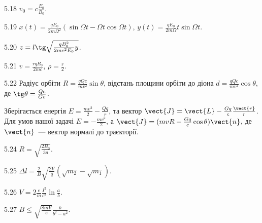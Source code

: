 \begin{Solution}{5.{18}}
	$v_0 = c\frac{E_0}{B_0}$.
\end{Solution}
\begin{Solution}{5.{19}}
	$x(t)  = \frac{qE_0}{2m\Omega^2}\left( \sin\Omega t - \Omega t\cos\Omega t \right) $,
	$y(t)  = \frac{qE_0}{2m\Omega}t\sin\Omega t$.
\end{Solution}
\begin{Solution}{5.{20}}
	$z = l\tg\sqrt{\frac{qB_0^2}{2mc^2E_0}y}$.
\end{Solution}
\begin{Solution}{5.{21}}
	$v = \frac{rqB_0}{2mc}$, $\rho = \frac{r}{2}$.
\end{Solution}
\begin{Solution}{5.{22}}
	Радіус орбіти $R = \frac{qQc}{mv^2}\sin\theta$, відстань площини орбіти до діона $d = \frac{qQc}{mv^2}\cos\theta$, де $\tg\theta = \frac{Q c}{G v}$.

	Зберігається енергія $E = \frac{mv^2}{2} - \frac{Qq}{r}$, та вектор $\vect{J} = \vect{L} - \frac{Gq}{c}\frac{\vect{r}}{r} $. Для умов нашої задачі $E = -\frac{mv^2}{2}$, а $\vect{J} = (mvR - \frac{Gq}{c}\cos\theta) \vect{n} $, де $\vect{n}$~--- вектор нормалі до траєкторії.
\end{Solution}
\begin{Solution}{5.{24}}
	$R = \sqrt{\frac{2B_0}{3a}}.$
\end{Solution}
\begin{Solution}{5.{25}}
	$\Delta l = \frac{2}{B}\sqrt{\frac{2V}{q}} \left( \sqrt{m_2} - \sqrt{m_1} \right) $.
\end{Solution}
\begin{Solution}{5.{26}}
	$V = 2\frac{e}{m}\frac{I^2}{c^2}\ln\frac{a}{b}$.
\end{Solution}
\begin{Solution}{5.{27}}
	$B \le \sqrt{\frac{8mV}{e}} \frac{b}{b^2 - a^2}$.
\end{Solution}
